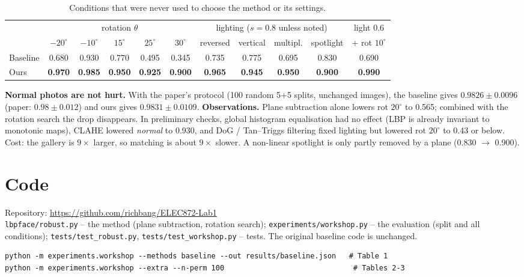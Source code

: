 \documentclass{article}
\newcommand{\repo}{\url{https://github.com/richbang/ELEC872-Lab1}}
\begin{document}
\begin{table}[H]
\centering\small
\begin{adjustbox}{max width=\linewidth}
\begin{tabular}{lcccccccccc}
\toprule
 & \multicolumn{5}{c}{rotation $\theta$} & \multicolumn{4}{c}{lighting ($s=0.8$ unless noted)} & light 0.6 \\
\cmidrule(lr){2-6}\cmidrule(lr){7-10}
 & $-20^\circ$ & $-10^\circ$ & $15^\circ$ & $25^\circ$ & $30^\circ$ & reversed & vertical & multipl. & spotlight & + rot $10^\circ$ \\
\midrule
Baseline & 0.680 & 0.930 & 0.770 & 0.495 & 0.345 & 0.735 & 0.775 & 0.695 & 0.830 & 0.690 \\
Ours     & \textbf{0.970} & \textbf{0.985} & \textbf{0.950} & \textbf{0.925} & \textbf{0.900} & \textbf{0.965} & \textbf{0.945} & \textbf{0.950} & \textbf{0.900} & \textbf{0.990} \\
\bottomrule
\end{tabular}
\end{adjustbox}
\caption{Conditions that were never used to choose the method or its settings.}
\end{table}
\vspace{-0.5cm}

\noindent\textbf{Normal photos are not hurt.} With the paper's protocol (100 random 5+5 splits,
unchanged images), the baseline gives $0.9826 \pm 0.0096$ (paper: $0.98 \pm 0.012$) and ours
gives $0.9831 \pm 0.0109$.
\textbf{Observations.} Plane subtraction alone lowers rot $20^\circ$ to 0.565; combined with
the rotation search the drop disappears. In preliminary checks, global histogram
equalisation had no effect (LBP is already invariant to monotonic maps), CLAHE lowered
\emph{normal} to 0.930, and DoG / Tan--Triggs filtering fixed lighting but lowered rot
$20^\circ$ to 0.43 or below. Cost: the gallery is $9\times$ larger, so matching is about
$9\times$ slower. A non-linear spotlight is only partly removed by a plane (0.830 $\to$ 0.900).

\section{Code}

\noindent Repository: \repo\\
\texttt{lbpface/robust.py} -- the method (plane subtraction, rotation search);
\texttt{experiments/workshop.py} -- the evaluation (split and all conditions);
\texttt{tests/test\_robust.py}, \texttt{tests/test\_workshop.py} -- tests.
The original baseline code is unchanged.
\begin{verbatim}
python -m experiments.workshop --methods baseline --out results/baseline.json   # Table 1
python -m experiments.workshop --extra --n-perm 100                              # Tables 2-3
\end{verbatim}
\end{document}
